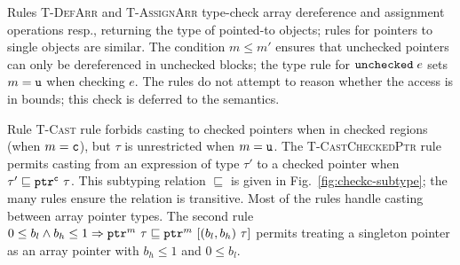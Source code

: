 %
Rules \textsc{T-DefArr} and \textsc{T-AssignArr} type-check array
dereference and assignment operations resp., returning the type of
pointed-to objects; rules for pointers to single objects are
similar.
The condition $m\le m'$ ensures that unchecked pointers can only
be dereferenced in unchecked blocks;
the type rule for
$\eunchecked{e}$ sets $m = \umode$ when checking $e$.
The rules do not attempt to reason whether the access is in bounds;
this check is deferred to the semantics.


%
Rule \textsc{T-Cast} rule forbids casting to checked pointers when in checked
regions (when $m = \cmode$), but $\tau$ is unrestricted when
$m = \umode$. The \textsc{T-CastCheckedPtr} rule
permits casting from an expression of type $\tau'$ to a checked pointer when
$\tau' \sqsubseteq \tptr{\tau}{\cmode}$. This subtyping relation
$\sqsubseteq$ is given in Fig.~\ref{fig:checkc-subtype}; the many
rules ensure the relation is transitive. Most of the rules handle
casting between array pointer types. The second rule 
$0\le b_l \wedge b_h \le 1 \Rightarrow \tptr{\tau}{m}\sqsubseteq
\tarrayptr{b_l}{b_h}{\tau}{m}$ permits treating a singleton
pointer as an array pointer with $b_h\le 1$ and $0 \le b_l$.

